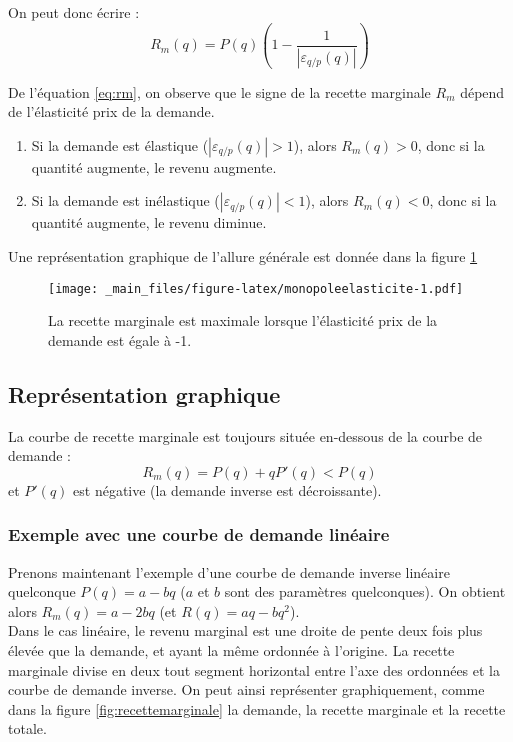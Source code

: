 \documentclass[
  a4paper,
]{book}
\providecommand{\tightlist}{%
  \setlength{\itemsep}{0pt}\setlength{\parskip}{0pt}}
\theoremstyle{definition}
\theoremstyle{definition}
\theoremstyle{definition}
\theoremstyle{definition}
\theoremstyle{remark}
\begin{document}
On peut donc écrire :
\begin{equation}
R_m(q) = P(q)\left(1 - \frac{1}{|\varepsilon_{q/p}(q)|}\right)
\label{eq:rm}
\end{equation}

De l'équation \eqref{eq:rm}, on observe que le signe de la recette marginale \(R_m\) dépend de l'élasticité prix de la demande.

\begin{enumerate}
\def\labelenumi{\arabic{enumi}.}
\tightlist
\item
  Si la demande est élastique (\(|\varepsilon_{q/p}(q)|>1\)), alors \(R_m(q)>0\), donc si la quantité augmente, le revenu augmente.
\item
  Si la demande est inélastique (\(|\varepsilon_{q/p}(q)|<1\)), alors \(R_m(q)<0\), donc si la quantité augmente, le revenu diminue.
\end{enumerate}

Une représentation graphique de l'allure générale est donnée dans la figure \ref{fig:monopoleelasticite}

\begin{figure}
\centering
\texttt{[image: \_main\_files/figure-latex/monopoleelasticite-1.pdf]}
\caption{\label{fig:monopoleelasticite}La recette marginale est maximale lorsque l'élasticité prix de la demande est égale à -1.}
\end{figure}

\hypertarget{repruxe9sentation-graphique}{%
\subsection{Représentation graphique}\label{repruxe9sentation-graphique}}

La courbe de recette marginale est toujours située en-dessous de la courbe de demande :
\[
R_m(q) = P(q) + qP'(q) < P(q)
\]
et \(P'(q)\) est négative (la demande inverse est décroissante).

\hypertarget{exemple-avec-une-courbe-de-demande-linuxe9aire}{%
\subsubsection{Exemple avec une courbe de demande linéaire}\label{exemple-avec-une-courbe-de-demande-linuxe9aire}}

Prenons maintenant l'exemple d'une courbe de demande inverse linéaire quelconque \(P(q) = a-bq\) (\(a\) et \(b\) sont des paramètres quelconques).
On obtient alors \(R_m(q) = a-2bq\) (et \(R(q) = aq-bq^2\)).\\
Dans le cas linéaire, le revenu marginal est une droite de pente deux fois plus élevée que la demande, et ayant la même ordonnée à l'origine.
La recette marginale divise en deux tout segment horizontal entre l'axe des ordonnées et la courbe de demande inverse.
On peut ainsi représenter graphiquement, comme dans la figure \ref{fig:recettemarginale} la demande, la recette marginale et la recette totale.
\end{document}
